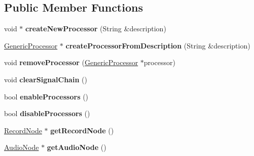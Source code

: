 \subsection*{Public Member Functions}
\begin{DoxyCompactItemize}
\item 
\hypertarget{classProcessorGraph_a75a8c555386eb322aabb83b6cb651f76}{void $\ast$ {\bfseries create\-New\-Processor} (String \&description)}\label{classProcessorGraph_a75a8c555386eb322aabb83b6cb651f76}

\item 
\hypertarget{classProcessorGraph_a91f653d71fcc41eb5ac7976da64be5f5}{\hyperlink{classGenericProcessor}{Generic\-Processor} $\ast$ {\bfseries create\-Processor\-From\-Description} (String \&description)}\label{classProcessorGraph_a91f653d71fcc41eb5ac7976da64be5f5}

\item 
\hypertarget{classProcessorGraph_a3ca938850a4e4f27cae467eeff5046cf}{void {\bfseries remove\-Processor} (\hyperlink{classGenericProcessor}{Generic\-Processor} $\ast$processor)}\label{classProcessorGraph_a3ca938850a4e4f27cae467eeff5046cf}

\item 
\hypertarget{classProcessorGraph_a9affe0a1bddce5272cab547d4c38472a}{void {\bfseries clear\-Signal\-Chain} ()}\label{classProcessorGraph_a9affe0a1bddce5272cab547d4c38472a}

\item 
\hypertarget{classProcessorGraph_acece6f68878404ef8672af84a10e23f3}{bool {\bfseries enable\-Processors} ()}\label{classProcessorGraph_acece6f68878404ef8672af84a10e23f3}

\item 
\hypertarget{classProcessorGraph_a2c0c9688eeaea12a8fe5357b73e58785}{bool {\bfseries disable\-Processors} ()}\label{classProcessorGraph_a2c0c9688eeaea12a8fe5357b73e58785}

\item 
\hypertarget{classProcessorGraph_a1ff73af3414c2329cf1db7d3dc5ccc78}{\hyperlink{classRecordNode}{Record\-Node} $\ast$ {\bfseries get\-Record\-Node} ()}\label{classProcessorGraph_a1ff73af3414c2329cf1db7d3dc5ccc78}

\item 
\hypertarget{classProcessorGraph_af34c4fcdf99f327c922daf6a9e4c9caf}{\hyperlink{classAudioNode}{Audio\-Node} $\ast$ {\bfseries get\-Audio\-Node} ()}\label{classProcessorGraph_af34c4fcdf99f327c922daf6a9e4c9caf}


\end{DoxyCompactItemize}
